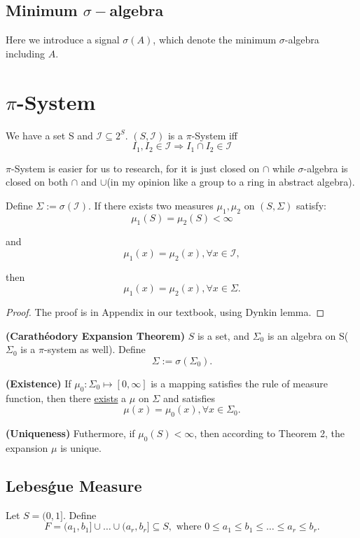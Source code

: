 \subsection{Minimum $\sigma-$algebra} 
Here  we introduce a signal $\sigma(A)$, which denote the minimum $\sigma$-algebra including $A$.

\section{$\pi$-System}
We have a set S and $\mathcal I \subseteq 2^S$. $(S,\mathcal I)$ is a $\pi$-System iff 
$$I_1,I_2\in\mathcal I \Rightarrow I_1 \cap I_2 \in \mathcal I$$

$\pi$-System is easier for us to research, for it is just closed on $\cap$ while $\sigma$-algebra is closed on both $\cap$ and $\cup$(in my opinion like a group to a ring in abstract algebra).

\begin{theorem}
  Define $\Sigma := \sigma(\mathcal I)$. If there exists two measures $\mu_1,\mu_2$ on $(S,\Sigma)$ satisfy:
  $$\mu_1(S) = \mu_2(S) < \infty$$

and
$$\mu_1(x) = \mu_2(x), \forall x\in \mathcal I,$$

then 
$$\mu_1(x) = \mu_2(x), \forall x\in \Sigma.$$
\end{theorem}

\begin{proof}
  The proof is in Appendix in our textbook, using Dynkin lemma.
\end{proof}
\begin{theorem}
\textbf{(Carath\'eodory Expansion Theorem)} $S$ is a set, and $\Sigma_0$ is an algebra on S($\Sigma_0$ is a $\pi$-system as well). Define $$\Sigma := \sigma(\Sigma_0).$$

 \textbf{(Existence)}  If $\mu_0:\Sigma_0 \mapsto [0,\infty]$ is a mapping satisfies the rule of measure function, then there \underline{exists} a $\mu$ on $\Sigma$ and satisfies 
$$\mu(x) = \mu_0(x), \forall x\in \Sigma_0. $$

\textbf{(Uniqueness)} Futhermore, if $\mu_0(S) < \infty$, then according to Theorem 2, the expansion $\mu$ is unique.

\end{theorem}

\subsection{Lebes\'gue Measure}
Let $S = (0,1].$ Define
$$F = (a_1,b_1] \cup \dots \cup (a_r,b_r] \subseteq S, \text{ where } 0 \leq a_1\leq b_1\leq \dots \leq a_r\leq b_r.$$

